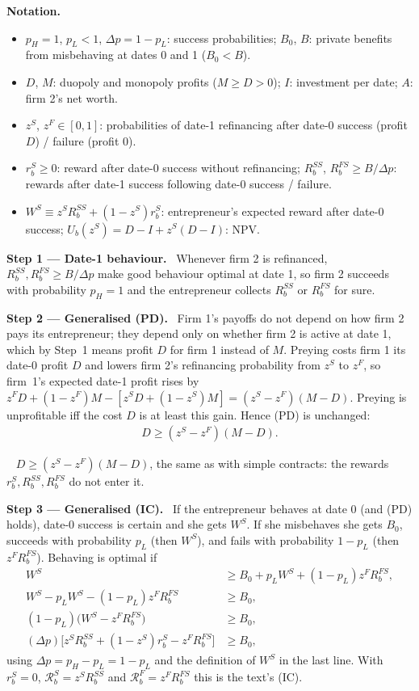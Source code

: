 \documentclass[11pt,a4paper]{article}
\newcommand{\notation}{\par\noindent\textbf{Notation.}}
\newcommand{\step}[2]{\par\medskip\noindent\textbf{Step #1 --- #2.}~}
\newcommand{\answer}[1]{\par\smallskip\noindent\fbox{\textbf{Answer #1.}}~}
\begin{document}
\notation
\begin{itemize}
  \item $p_H=1$, $p_L<1$, $\Delta p=1-p_L$: success probabilities; $B_0$, $B$: private benefits from misbehaving at dates 0 and 1 ($B_0<B$).
  \item $D$, $M$: duopoly and monopoly profits ($M\geq D>0$); $I$: investment per date; $A$: firm 2's net worth.
  \item $z^S$, $z^F\in[0,1]$: probabilities of date-1 refinancing after date-0 success (profit $D$) / failure (profit 0).
  \item $r_b^S\geq0$: reward after date-0 success without refinancing; $R_b^{SS}$, $R_b^{FS}\geq B/\Delta p$: rewards after date-1 success following date-0 success / failure.
  \item $W^S\equiv z^SR_b^{SS}+(1-z^S)r_b^S$: entrepreneur's expected reward after date-0 success; $U_b(z^S)=D-I+z^S(D-I)$: NPV.
\end{itemize}

\step{1}{Date-1 behaviour} Whenever firm 2 is refinanced, $R_b^{SS},R_b^{FS}\geq B/\Delta p$ make good
behaviour optimal at date 1, so firm 2 succeeds with probability $p_H=1$ and the entrepreneur
collects $R_b^{SS}$ or $R_b^{FS}$ for sure.

\step{2}{Generalised (PD)} Firm 1's payoffs do not depend on how firm 2 pays its entrepreneur;
they depend only on whether firm 2 is active at date 1, which by Step~1 means profit $D$ for firm 1
instead of $M$. Preying costs firm 1 its date-0 profit $D$ and lowers firm 2's refinancing
probability from $z^S$ to $z^F$, so firm~1's expected date-1 profit rises by
$z^FD+(1-z^F)M-[z^SD+(1-z^S)M]=(z^S-z^F)(M-D)$. Preying is unprofitable iff the cost $D$ is at least this
gain. Hence (PD) is unchanged:
\begin{align}
  D \geq (z^S-z^F)(M-D). \label{t5e6-PD}
\end{align}

\answer{(PD)} $D\ge(z^S-z^F)(M-D)$, the same as with simple contracts: the rewards
$r_b^S,R_b^{SS},R_b^{FS}$ do not enter it.

\step{3}{Generalised (IC)} If the entrepreneur behaves at date 0 (and (PD) holds), date-0 success is
certain and she gets $W^S$. If she misbehaves she gets $B_0$, succeeds with probability $p_L$ (then
$W^S$), and fails with probability $1-p_L$ (then $z^FR_b^{FS}$). Behaving is optimal if
\begin{align}
  W^S &\geq B_0+p_LW^S+(1-p_L)z^FR_b^{FS}, \nonumber\\
  W^S-p_LW^S-(1-p_L)z^FR_b^{FS} &\geq B_0, \nonumber\\
  (1-p_L)\bigl(W^S-z^FR_b^{FS}\bigr) &\geq B_0, \nonumber\\
  (\Delta p)\bigl[z^SR_b^{SS}+(1-z^S)r_b^S-z^FR_b^{FS}\bigr] &\geq B_0, \label{t5e6-IC}
\end{align}
using $\Delta p=p_H-p_L=1-p_L$ and the definition of $W^S$ in the last line.
With $r_b^S=0$, $\mathcal R_b^S=z^SR_b^{SS}$ and $\mathcal R_b^F=z^FR_b^{FS}$ this is the text's (IC).
\end{document}
